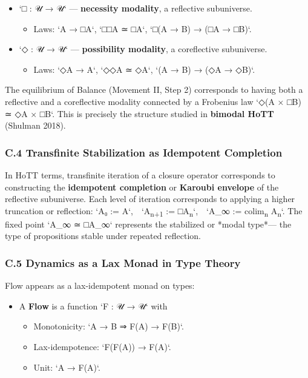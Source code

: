\documentclass[11pt]{article}
\begin{document}
\begin{itemize}
\item `□ : 𝒰 → 𝒰` — \textbf{necessity modality}, a reflective subuniverse.  
\begin{itemize}
\item Laws: `A → □A`, `□□A ≃ □A`, `□(A → B) → (□A → □B)`.
\end{itemize}

\item `◇ : 𝒰 → 𝒰` — \textbf{possibility modality}, a coreflective subuniverse.  
\begin{itemize}
\item Laws: `◇A → A`, `◇◇A ≃ ◇A`, `(A → B) → (◇A → ◇B)`.
\end{itemize}
\end{itemize}

The equilibrium of Balance (Movement II, Step 2)  
corresponds to having both a reflective and a coreflective modality  
connected by a Frobenius law  
`◇(A × □B) ≃ ◇A × □B`.  
This is precisely the structure studied in \textbf{bimodal HoTT} (Shulman 2018).
\subsubsection*{C.4 Transfinite Stabilization as Idempotent Completion}
\label{sec:org7552c3a}
In HoTT terms, transfinite iteration of a closure operator  
corresponds to constructing the \textbf{idempotent completion} or \textbf{Karoubi envelope}  
of the reflective subuniverse.  
Each level of iteration corresponds to applying a higher truncation or reflection:  
`A₀ := A`, `A\textsubscript{n+1} := □A\textsubscript{n}`, `A\_∞ := colim\textsubscript{n} A\textsubscript{n}`.  
The fixed point `A\_∞ ≃ □A\_∞` represents the stabilized or *modal type*—  
the type of propositions stable under repeated reflection.
\subsubsection*{C.5 Dynamics as a Lax Monad in Type Theory}
\label{sec:org3814913}
Flow appears as a lax-idempotent monad on types:

\begin{itemize}
\item A \textbf{Flow} is a function `F : 𝒰 → 𝒰` with  
\begin{itemize}
\item Monotonicity: `A → B ⇒ F(A) → F(B)`.
\item Lax-idempotence: `F(F(A)) → F(A)`.
\item Unit: `A → F(A)`.
\end{itemize}
\end{itemize}
\end{document}
